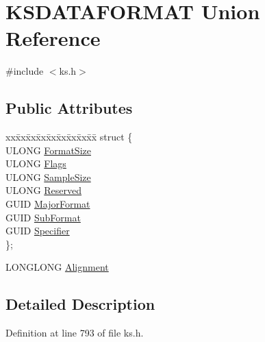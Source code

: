 \hypertarget{union_k_s_d_a_t_a_f_o_r_m_a_t}{}\section{K\+S\+D\+A\+T\+A\+F\+O\+R\+M\+AT Union Reference}
\label{union_k_s_d_a_t_a_f_o_r_m_a_t}


{\ttfamily \#include $<$ks.\+h$>$}

\subsection*{Public Attributes}
\begin{DoxyCompactItemize}
\item 
\begin{tabbing}
xx\=xx\=xx\=xx\=xx\=xx\=xx\=xx\=xx\=\kill
struct \{\\
\>ULONG \hyperlink{union_k_s_d_a_t_a_f_o_r_m_a_t_aa23bba961cb89d7c270b76c997bc82bd}{FormatSize}\\
\>ULONG \hyperlink{union_k_s_d_a_t_a_f_o_r_m_a_t_a5ac62313a7451af29843a36ab8f36498}{Flags}\\
\>ULONG \hyperlink{union_k_s_d_a_t_a_f_o_r_m_a_t_afcc41adbaf122f7345b49bc4e2554a6f}{SampleSize}\\
\>ULONG \hyperlink{union_k_s_d_a_t_a_f_o_r_m_a_t_a7f0a5c20555a3882711fdf9494fefaf3}{Reserved}\\
\>GUID \hyperlink{union_k_s_d_a_t_a_f_o_r_m_a_t_a71601273fdfb0ceee3866f02187b517e}{MajorFormat}\\
\>GUID \hyperlink{union_k_s_d_a_t_a_f_o_r_m_a_t_a58a48636b6942b0f4676ee0861ea6386}{SubFormat}\\
\>GUID \hyperlink{union_k_s_d_a_t_a_f_o_r_m_a_t_a05a04e431afcc9d5a007bce301156c8c}{Specifier}\\
\}; \\

\end{tabbing}\item 
L\+O\+N\+G\+L\+O\+NG \hyperlink{union_k_s_d_a_t_a_f_o_r_m_a_t_a6d13f523a837ebe26372f32b740b02d7}{Alignment}
\end{DoxyCompactItemize}


\subsection{Detailed Description}


Definition at line 793 of file ks.\+h.




